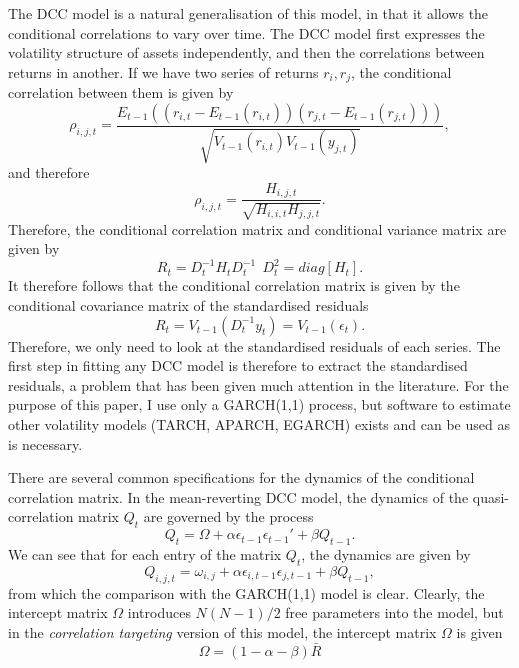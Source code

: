 \documentclass{article} %
\numberwithin{equation}{section} %
\numberwithin{figure}{section} %
\numberwithin{table}{section} %
\begin{document}
The DCC model is a natural generalisation of this model, in that it allows the conditional correlations to vary over time. The DCC model first expresses the volatility structure of assets independently, and then the correlations between returns in another. If we have two series of returns $r_i, r_j$, the conditional correlation between them is given by
\begin{equation}
  \rho_{i,j,t} = \frac{E_{t-1}((r_{i,t} - E_{t-1}(r_{i,t}))(r_{j,t} - E_{t-1}(r_{j,t})))}
                      {\sqrt{V_{t-1}(r_{i,t})V_{t-1}(y_{j,t})}},
\end{equation}
and therefore
\begin{equation}
\rho_{i,j,t} =  \frac{H_{i,j,t}}{\sqrt{H_{i,i,t}H_{j,j,t}}}.
\end{equation}
Therefore, the conditional correlation matrix and conditional variance matrix are given by
\begin{equation}
  R_t = D_t^{-1} H_t D_t ^{-1} \ \  D_t ^2 = diag[H_t].
\end{equation}
It therefore follows that the conditional correlation matrix is given by the conditional covariance matrix of the standardised residuals
\begin{equation}
R_t = V_{t-1} (D_t^{-1}y_t) = V_{t-1}(\epsilon_t).
\end{equation}
Therefore, we only need to look at the standardised residuals of each series. The first step in fitting any DCC model is therefore to extract the standardised residuals, a problem that has been given much attention in the literature. For the purpose of this paper, I use only a GARCH(1,1) process, but software to estimate other volatility models (TARCH, APARCH, EGARCH) exists and can be used as is necessary.

There are several common specifications for the dynamics of the conditional correlation matrix. In the mean-reverting DCC model, the dynamics of the quasi-correlation matrix $Q_t$ are governed by the process
\begin{equation} \label{correlation targeting}
  Q_t = \Omega + \alpha \epsilon_{t-1}\epsilon_{t-1}' + \beta Q_{t-1}.
\end{equation}
We can see that for each entry of the matrix $Q_t$, the dynamics are given by
\begin{equation}
Q_{i,j,t} = \omega_{i,j} + \alpha \epsilon_{i,t-1}\epsilon_{j,t-1} + \beta Q_{t-1},
\end{equation}
from which the comparison with the GARCH(1,1) model is clear. Clearly, the intercept matrix $\Omega$ introduces $N(N-1)/2$ free parameters into the model, but in the \emph{correlation targeting} version of this model, the intercept matrix $\Omega$ is given
\begin{equation}\label{eq: correlation targeting}
  \Omega = (1 - \alpha - \beta)\bar{R}
\end{equation}
\end{document}
